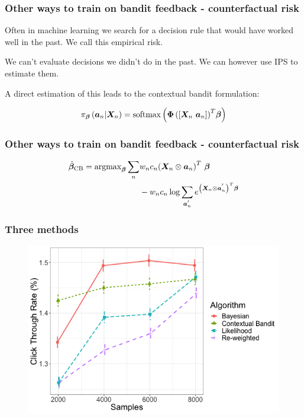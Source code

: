 \begin{frame}
  \frametitle{Other ways to train on bandit feedback - counterfactual risk}

  Often in machine learning we search for a decision rule that would have worked well in the past.  \pause We call this empirical risk.

  \pause

  We can't evaluate decisions we didn't do in the past.  \pause We can however use IPS to estimate them.

  \pause

  A direct estimation of this leads to the contextual bandit formulation:

  \pause


  \[
    \pi_{\bm{\beta}}\left( {\bm{a}}_n | {\bm{X}}_n \right) = {\rm softmax}
      \left( {\bm{\Phi}
        \left(
          \left[ \bm{X}_n ~ \bm{a}_n \right]
        \right)}^T \bm{\beta}
      \right)
  \]  

\end{frame}


\begin{frame}
  \frametitle{Other ways to train on bandit feedback - counterfactual risk}

\begin{align*}
	\hat{\bm{\beta}}_{\rm CB} = {\rm argmax}_{\bm{\beta}} \sum_n
	& w_n c_n
		{\left(
			{\bm{X}}_n \otimes {\bm{a}}_n
		\right)}^T ~ \bm{\beta} \\
	& - w_n c_n \log \sum_{{\bm{a}}_{n}^{'}} e^{
						{\left(
							{\bm{X}}_n \otimes {\bm{a}}_{n}^{'}
						\right)}^T \bm{\beta}
						} \\
\end{align*}

\end{frame}



\begin{frame}
  \frametitle{Three methods}
\begin{figure}[h!]
\includegraphics[scale=0.45]{images/pop_sampling_run.png}
\centering
\end{figure}


\end{frame}



